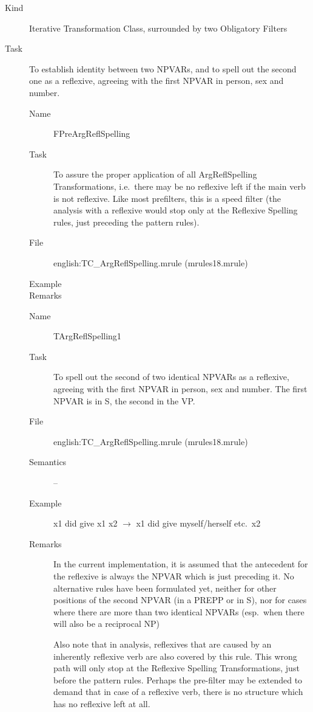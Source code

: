 \begin{description}
\item[Kind] Iterative Transformation Class, surrounded by two Obligatory 
Filters
\item[Task] To establish identity between two NPVARs, and to spell 
out the second one as a reflexive, 
agreeing with the first NPVAR in person, sex and number.

\vspace{1 cm}
\begin{description}
\item[Name] FPreArgReflSpelling
\item[Task] To assure the proper application of all ArgReflSpelling 
Transformations, i.e.\ there 
may be no reflexive left if the main verb is not reflexive. Like most 
prefilters, this is a speed filter (the analysis with a reflexive would stop 
only at the Reflexive Spelling rules, just preceding the pattern rules).
\item[File] english:TC\_ArgReflSpelling.mrule (mrules18.mrule)
\item[Example] 
\item[Remarks]
\end{description}

\vspace{1 cm}
\begin{description}
\item[Name] TArgReflSpelling1
\item[Task] To spell out the second of two identical NPVARs as a reflexive, 
agreeing with the first NPVAR in person, sex and number. The first NPVAR is in 
S, the second in the VP.
\item[File] english:TC\_ArgReflSpelling.mrule (mrules18.mrule)
\item[Semantics] -- 
\item[Example] x1 did give x1 x2 $\rightarrow$ x1 did give myself/herself etc.\ 
x2
\item[Remarks] In the current implementation, it is assumed that the antecedent 
for the reflexive is always the NPVAR which is just preceding it. No 
alternative rules have been formulated yet, neither for other positions of the 
second NPVAR (in a PREPP or in S), nor for cases where there are more than two 
identical NPVARs (esp.\ when there will also be a reciprocal NP)

Also note that in analysis, reflexives that are caused by an inherently 
reflexive verb are also covered by this rule. This wrong path will only stop at 
the Reflexive Spelling Transformations, just before the pattern rules. Perhaps 
the pre-filter may be extended to demand that in case of a reflexive verb, 
there is no structure which has no reflexive left at all. 
\end{description}


\end{description}

